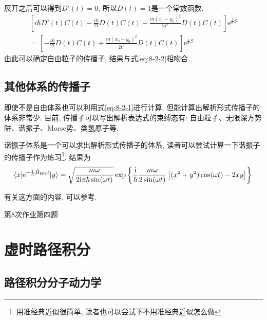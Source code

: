         展开之后可以得到$D'(t) = 0$, 所以$D(t)=1$是一个常数函数. 
        \begin{equation}\begin{aligned}
            \left[i\hbar D'(t) C(t) - \frac{i\hbar}{2t} D(t) C(t) + \frac{m(x_0-y_0)^2}{2t^2} D(t) C(t) \right] \mathrm{e}^{\frac {\mathrm{i}}{\hbar} S} \\
            = \left[- \frac{i\hbar}{2t} D(t) C(t) + \frac{m(x_0-y_0)^2}{2t^2} D(t) C(t)\right] \mathrm{e}^{\frac {\mathrm{i}}{\hbar} S}
        \end{aligned}\end{equation}
        由此可以确定自由粒子的传播子, 结果与式\ref{eq:8-2-2}相吻合. 

        \subsection{其他体系的传播子}

        即使不是自由体系也可以利用式\ref{eq:8-2-1}进行计算, 但能计算出解析形式传播子的体系非常少. 目前, 传播子可以写出解析表达式的束缚态有: 自由粒子、无限深方势阱、谐振子、Morse势、类氢原子等\cite{Grosche_HFPI}\cite{Kleinnert_PIQMSPP}. 

        谐振子体系是一个可以求出解析形式传播子的体系, 读者可以尝试计算一下谐振子的传播子作为练习\footnote{用准经典近似很简单, 读者也可以尝试下不用准经典近似怎么做}. 结果为
        \begin{equation}
            \langle x | \mathrm{e}^{-\frac {\mathrm{i}}{\hbar}\hat{H}_\mathrm{HO}t} | y \rangle = \sqrt{\frac{m\omega}{2\mathrm{i}\pi\hbar\sin(\omega t)}} \exp\left\{ \frac{\mathrm{i}}{\hbar} \frac{m\omega}{2\sin(\omega t)}\left[ (x^2 + y^2)\cos(\omega t) - 2xy \right] \right\} \\
        \end{equation}

        有关这方面的内容, 可以参考\cite{费曼量子力学与路径积分}\cite{谷村吉隆化学物理入门}.

        \begin{asg}
            第8次作业第四题
        \end{asg}

    \section{虚时路径积分}

        \subsection{路径积分分子动力学}

